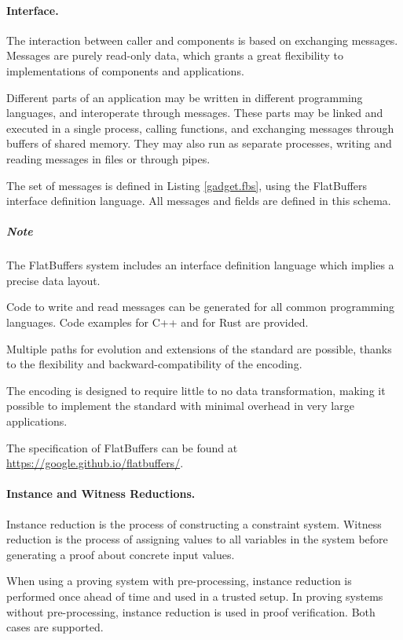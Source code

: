 \paragraph{Interface.}

	The interaction between caller and components is based on exchanging messages.
	Messages are purely read-only data, which grants a great flexibility to
	implementations of components and applications.

	Different parts of an application may be written in different programming languages, and interoperate through messages.
	These parts may be linked and executed in a single process, calling functions,
	and exchanging messages through buffers of shared memory.
	They may also run as separate processes, writing and reading messages in files or through pipes.

	The set of messages is defined in Listing \ref{gadget.fbs}, 
	using the FlatBuffers interface definition language.
	All messages and fields are defined in this schema.

	\subparagraph{Note}
	The FlatBuffers system includes an interface definition language
	which implies a precise data layout.

	Code to write and read messages can be generated for all common programming languages. Code examples for C++ and for Rust are provided.
	
	Multiple paths for evolution and extensions of the standard are possible,
	thanks to the flexibility and backward-compatibility of the encoding.

	The encoding is designed to require little to no data transformation, making it possible to implement the standard with minimal overhead in very large applications.

	The specification of FlatBuffers can be found at
	\href{https://google.github.io/flatbuffers/}{https://google.github.io/flatbuffers/}.

\paragraph{Instance and Witness Reductions.}

	Instance reduction is the process of constructing a constraint system.
	Witness reduction is the process of assigning values to all variables
	in the system before generating a proof about concrete input values.

	When using a proving system with pre-processing, instance reduction
	is performed once ahead of time and used in a trusted setup.
	In proving systems without pre-processing, instance reduction is used in proof verification.
	Both cases are supported.

